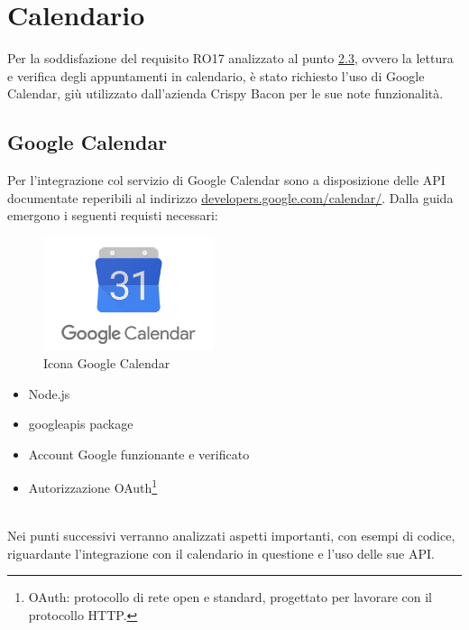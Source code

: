 \newpage
\section{Calendario}
Per la soddisfazione del requisito RO17 analizzato al punto \hyperref[requisti-richiesti]{2.3}, ovvero la lettura e verifica degli appuntamenti in calendario, è stato richiesto l'uso di Google Calendar, giù utilizzato dall'azienda Crispy Bacon per le sue note funzionalità. 
\subsection{Google Calendar}
Per l’integrazione col servizio di Google Calendar sono a disposizione delle API documentate reperibili al indirizzo \href{https://developers.google.com/calendar/}{developers.google.com/calendar/}. Dalla guida emergono i seguenti requisti necessari:\\
\begin{minipage}{0.5\textwidth}
	\begin{figure}[H]
		\includegraphics[width=5cm]{immagini/google_calendar.png}
		\caption{\label{fig:icona_google_calendar}Icona Google Calendar}
	\end{figure}
\end{minipage}
\begin{minipage}{0.5\textwidth}
	\begin{itemize}
		\item Node.js
    	\item googleapis package
    	\item Account Google funzionante e verificato
    	\item Autorizzazione OAuth\footnote{OAuth: protocollo di rete open e standard, progettato per lavorare con il protocollo HTTP.}
	\end{itemize}
\end{minipage}
\\[0.5cm]
Nei punti successivi verranno analizzati aspetti importanti, con esempi di codice, riguardante l'integrazione con il calendario in questione e l’uso delle sue API.
